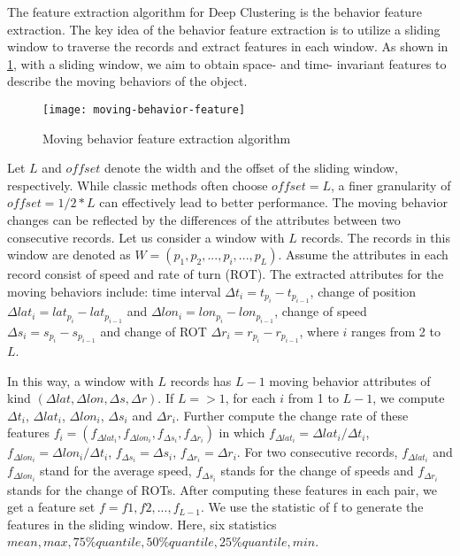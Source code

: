 The feature extraction algorithm for Deep Clustering is the behavior feature extraction. The key idea of the behavior feature extraction is to utilize a sliding window to traverse the records and extract features in each window. As shown in \ref{fig:moving-behavior-feature}, with a sliding window, we aim to obtain space- and time- invariant features to describe the moving behaviors of the object.

\begin{figure}[bt]
	\centering
	\texttt{[image: moving-behavior-feature]}
	\caption{Moving behavior feature extraction algorithm}
	\label{fig:moving-behavior-feature}
\end{figure}

Let $L$ and $offset$ denote the width and the offset of the sliding window, respectively. While classic methods often choose $offset = L$, a finer granularity of $offset= 1/2 * L$ can effectively lead to better performance. 
The moving behavior changes can be reflected by the differences of the attributes between two consecutive records. Let us consider a window with $L$ records. The records in this window are denoted as $W = (p_1, p_2, ..., p_i, ..., p_L)$. 
Assume the attributes in each record consist of speed and rate of turn (ROT). The extracted attributes for the moving behaviors include: time interval $\Delta t_i = t_{p_i} - t_{p_{i-1}}$, change of position $\Delta lat_i = lat_{p_i} - lat_{p_{i-1}}$ and $\Delta lon_i = lon_{p_i} - lon_{p_{i-1}}$, change of speed $\Delta s_i = s_{p_i} - s_{p_{i-1}}$ and change of ROT $\Delta r_i = r_{p_i} - r_{p_{i-1}}$, where $i$ ranges from 2 to $L$. 

In this way, a window with $L$ records has $L-1$ moving behavior attributes of kind $(\Delta lat, \Delta lon, \Delta s, \Delta r)$.
If $L => 1$, for each $i$ from 1 to $L-1$, we compute $\Delta t_i$, $\Delta lat_i$, $\Delta lon_i$, $\Delta s_i$ and $\Delta r_i$. Further compute the change rate of these features $f_i = (f_{\Delta lat_i}, f_{\Delta lon_i}, f_{\Delta s_i}, f_{\Delta r_i})$ in which $f_{\Delta lat_i} = \Delta lat_i / \Delta t_i$, $f_{\Delta lon_i} = \Delta lon_i / \Delta t_i$, $f_{\Delta s_i} = \Delta s_i$, $f_{\Delta r_i} = \Delta r_i$. For two consecutive records, $f_{\Delta lat_i}$ and $f_{\Delta lon_i}$ stand for the average speed, $f_{\Delta s_i}$ stands for the change of speeds and $f_{\Delta r_i}$ stands for the change of ROTs. After computing these features in each pair, we get a feature set $f = {f1, f2, ..., f_{L-1}}$. We use the statistic of f to generate the features in the sliding window. Here, six statistics ${mean, max, 75\%quantile, 50\%quantile, 25\%quantile, min}$.

